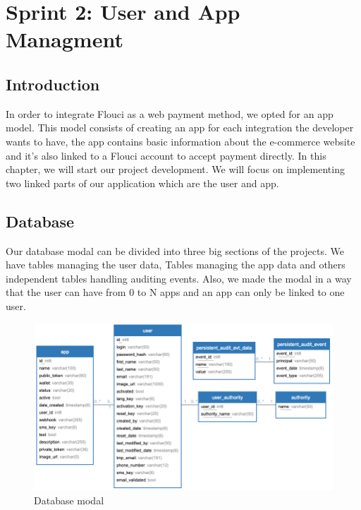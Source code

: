 
\setcounter{chapter}{3}
\chapter{Sprint 2: User and App Managment}
\minitoc %
\graphicspath{{Chapter4/figures/}}

\pagestyle{fancy}
\fancyhf{}
\fancyhead[R]{\bfseries\rightmark}
\fancyfoot[R]{\thepage}
\renewcommand{\headrulewidth}{0.5pt}
\renewcommand{\footrulewidth}{0pt}
\renewcommand{\chaptermark}[1]{\markboth{\MakeUppercase{\chaptername~\thechapter. #1 }}{}}
\renewcommand{\sectionmark}[1]{\markright{\thechapter.\thesection~ #1}}

\begin{spacing}{1.2}

\section*{Introduction}
In order to integrate Flouci as a web payment method, we opted for an app model. This model consists of creating an app for each integration the developer wants to have, the app contains basic information about the e-commerce website and it's also linked to a Flouci account to accept payment directly.
\newline
In this chapter, we will start our project development. We will focus on implementing two linked parts of our application which are the user and app. 

\section{Database}
Our database modal can be divided into three big sections of the projects. We have tables managing the user data, Tables managing the app data and others independent tables handling auditing events. Also, we made the modal in a way that the user can have from 0 to N apps and an app can only be linked to one user.

\begin{figure}[H]\centering
\includegraphics[scale=0.6]{db.png}
\caption{Database modal}
\label{fig:database}
\end{figure}



\end{spacing}
